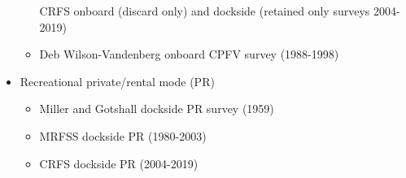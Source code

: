 \documentclass[11pt,
  english,
]{article}
\begin{document}
\begin{itemize}
\begin{itemize}

    CRFS onboard (discard only) and dockside (retained only surveys 2004-2019)

    \tagmcend\tagstructend\tagstructend

    \tagmcend\tagstructend\tagstructend
  \item


    Deb Wilson-Vandenberg onboard CPFV survey (1988-1998)

    \tagmcend\tagstructend\tagstructend

    \tagmcend\tagstructend\tagstructend
  \end{itemize}

  \tagstructend
\item

  Recreational private/rental mode (PR)

  \tagmcend\tagstructend\tagstructend


  \begin{itemize}
  \item


    Miller and Gotshall dockside PR survey (1959)

    \tagmcend\tagstructend\tagstructend

    \tagmcend\tagstructend\tagstructend
  \item


    MRFSS dockside PR (1980-2003)

    \tagmcend\tagstructend\tagstructend

    \tagmcend\tagstructend\tagstructend
  \item


    CRFS dockside PR (2004-2019)

    \tagmcend\tagstructend\tagstructend

    \tagmcend\tagstructend\tagstructend
  \end{itemize}

  \tagstructend
\end{itemize}
\end{document}
